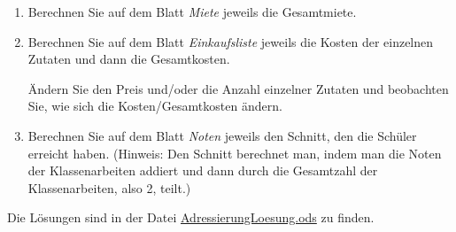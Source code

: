 \begin{Exercise}[title={Öffnen Sie die Datei \href{file:./Uebungsblaetter/Adressierung.ods}{Adressierung.ods}}, label=Adressierung]
    \begin{enumerate}
        \item Berechnen Sie auf dem Blatt \textit{Miete} jeweils die Gesamtmiete.
        \item Berechnen Sie auf dem Blatt \textit{Einkaufsliste} jeweils die Kosten der einzelnen Zutaten und dann die Gesamtkosten.

        Ändern Sie den Preis und/oder die Anzahl einzelner Zutaten und beobachten Sie, wie sich die Kosten/Gesamtkosten ändern.
        \item Berechnen Sie auf dem Blatt \textit{Noten} jeweils den Schnitt, den die Schüler erreicht haben. (Hinweis: Den Schnitt berechnet man, indem man die Noten der Klassenarbeiten addiert und dann durch die Gesamtzahl der Klassenarbeiten, also 2, teilt.)
    \end{enumerate}
\end{Exercise}
\begin{Answer}[ref=Adressierung]
    Die Lösungen sind in der Datei \href{file:./Uebungsblaetter/AdressierungLoesung.ods}{AdressierungLoesung.ods} zu finden.
\end{Answer}
